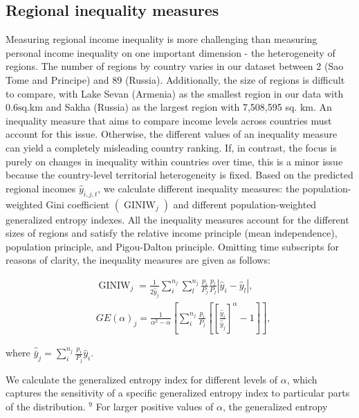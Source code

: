 \documentclass[10pt]{article}
\begin{document}
\subsection{Regional inequality measures}
Measuring regional income inequality is more challenging than measuring personal income inequality on one important dimension - the heterogeneity of regions. The number of regions by country varies in our dataset between 2 (Sao Tome and Principe) and 89 (Russia). Additionally, the size of regions is difficult to compare, with Lake Sevan (Armenia) as the smallest region in our data with $0.6 \mathrm{sq} . \mathrm{km}$ and Sakha (Russia) as the largest region with 7,508,595 sq. $\mathrm{km}$. An inequality measure that aims to compare income levels across countries must account for this issue. Otherwise, the different values of an inequality measure can yield a completely misleading country ranking. If, in contrast, the focus is purely on changes in inequality within countries over time, this is a minor issue because the country-level territorial heterogeneity is fixed. Based on the predicted regional incomes $\hat{y}_{i, j, t}$, we calculate different inequality measures: the population-weighted Gini coefficient $\left(\operatorname{GINIW}_{j}\right)$ and different population-weighted generalized entropy indexes. All the inequality measures account for the different sizes of regions and satisfy the relative income principle (mean independence), population principle, and Pigou-Dalton principle. Omitting time subscripts for reasons of clarity, the inequality measures are given as follows:

$$
\begin{aligned}
& \operatorname{GINIW}_{j}=\frac{1}{2 \hat{\bar{y}}_{j}} \sum_{i}^{n_{j}} \sum_{l}^{n_{j}} \frac{p_{i}}{P_{j}} \frac{p_{l}}{P_{j}}\left|\hat{y}_{i}-\hat{y}_{l}\right|, \\
& G E(\alpha)_{j}=\frac{1}{\alpha^{2}-\alpha}\left[\sum_{i}^{n_{j}} \frac{p_{i}}{P_{j}}\left[\left[\frac{\hat{y}_{i}}{\hat{\bar{y}}_{j}}\right]^{\alpha}-1\right]\right],
\end{aligned}
$$

where $\hat{\bar{y}}_{j}=\sum_{i}^{n_{j}} \frac{p_{i}}{P_{j}} \hat{y}_{i}$.

We calculate the generalized entropy index for different levels of $\alpha$, which captures the sensitivity of a specific generalized entropy index to particular parts of the distribution. ${ }^{9}$ For larger positive values of $\alpha$, the generalized entropy
\end{document}
